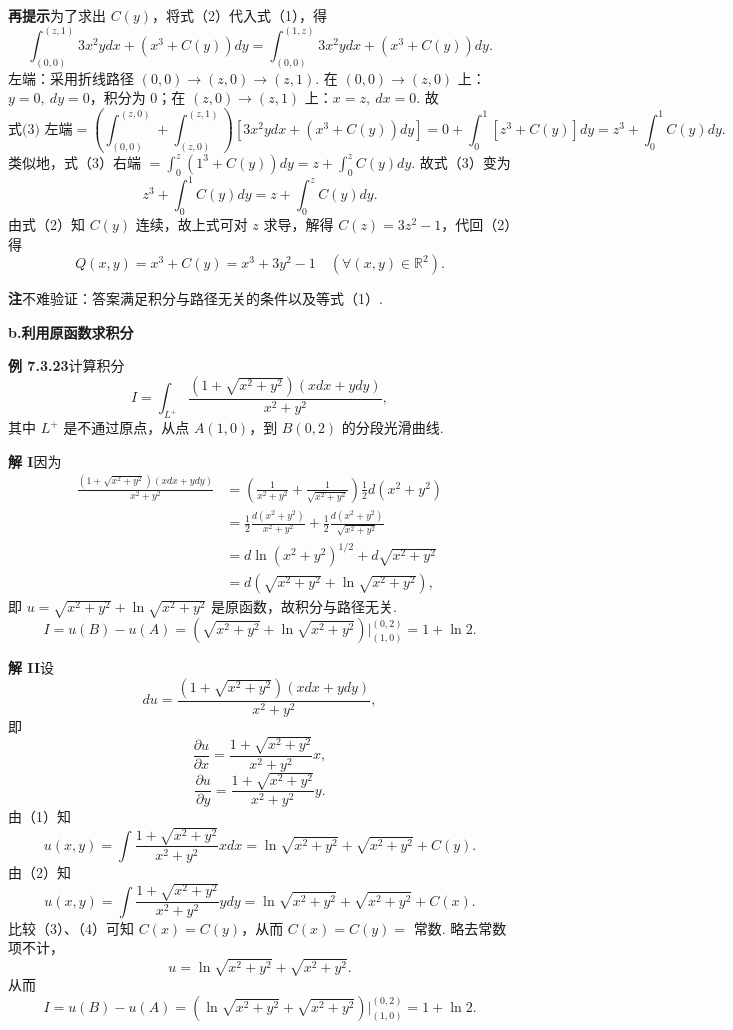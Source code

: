 \documentclass[UTF8,12pt,a4paper,fontset=fandol]{ctexart}
\begin{document}
\noindent\textbf{再提示}\quad 为了求出 $C(y)$，将式（2）代入式（1），得
\[
\int_{(0,0)}^{(z,1)}3x^2ydx+(x^3+C(y))dy
=\int_{(0,0)}^{(1,z)}3x^2ydx+(x^3+C(y))dy. \tag{3}
\]
左端：采用折线路径 $(0,0)\to(z,0)\to(z,1)$. 在 $(0,0)\to(z,0)$ 上：$y=0,\ dy=0$，积分为 0；在 $(z,0)\to(z,1)$ 上：$x=z,\ dx=0$. 故
\[
\text{式(3) 左端}
=\left(\int_{(0,0)}^{(z,0)}+\int_{(z,0)}^{(z,1)}\right)[3x^2ydx+(x^3+C(y))dy]
=0+\int_0^1[z^3+C(y)]dy=z^3+\int_0^1C(y)dy.
\]
类似地，式（3）右端 $=\displaystyle\int_0^z(1^3+C(y))dy=z+\int_0^zC(y)dy$.
故式（3）变为
\[
z^3+\int_0^1C(y)dy=z+\int_0^zC(y)dy.
\]
由式（2）知 $C(y)$ 连续，故上式可对 $z$ 求导，解得 $C(z)=3z^2-1$，代回（2）得
\[
Q(x,y)=x^3+C(y)=x^3+3y^2-1\quad(\forall(x,y)\in\mathbb R^2).
\]

\noindent\textbf{注}\quad 不难验证：答案满足积分与路径无关的条件以及等式（1）.

\noindent\textbf{b.\quad 利用原函数求积分}

\noindent\textbf{例 7.3.23}\quad 计算积分
\[
I=\int_{L^+}\frac{(1+\sqrt{x^2+y^2})(xdx+ydy)}{x^2+y^2},
\]
其中 $L^+$ 是不通过原点，从点 $A(1,0)$，到 $B(0,2)$ 的分段光滑曲线.

\noindent\textbf{解 I}\quad 因为
\[
\begin{aligned}
\frac{(1+\sqrt{x^2+y^2})(xdx+ydy)}{x^2+y^2}
&=\left(\frac1{x^2+y^2}+\frac1{\sqrt{x^2+y^2}}\right)\frac12d(x^2+y^2)\\
&=\frac12\frac{d(x^2+y^2)}{x^2+y^2}
+\frac12\frac{d(x^2+y^2)}{\sqrt{x^2+y^2}}\\
&=d\ln(x^2+y^2)^{1/2}+d\sqrt{x^2+y^2}\\
&=d\left(\sqrt{x^2+y^2}+\ln\sqrt{x^2+y^2}\right),
\end{aligned}
\]
即 $u=\sqrt{x^2+y^2}+\ln\sqrt{x^2+y^2}$ 是原函数，故积分与路径无关.
\[
I=u(B)-u(A)=
\left(\sqrt{x^2+y^2}+\ln\sqrt{x^2+y^2}\right)\Big|_{(1,0)}^{(0,2)}
=1+\ln2.
\]

\noindent\textbf{解 II}\quad 设
\[
du=\frac{(1+\sqrt{x^2+y^2})(xdx+ydy)}{x^2+y^2},
\]
即
\[
\frac{\partial u}{\partial x}
=\frac{1+\sqrt{x^2+y^2}}{x^2+y^2}x, \tag{1}
\]
\[
\frac{\partial u}{\partial y}
=\frac{1+\sqrt{x^2+y^2}}{x^2+y^2}y. \tag{2}
\]
由（1）知
\[
u(x,y)=\int\frac{1+\sqrt{x^2+y^2}}{x^2+y^2}xdx
=\ln\sqrt{x^2+y^2}+\sqrt{x^2+y^2}+C(y). \tag{3}
\]
由（2）知
\[
u(x,y)=\int\frac{1+\sqrt{x^2+y^2}}{x^2+y^2}ydy
=\ln\sqrt{x^2+y^2}+\sqrt{x^2+y^2}+C(x). \tag{4}
\]
比较（3）、（4）可知 $C(x)=C(y)$，从而 $C(x)=C(y)=$ 常数. 略去常数项不计，
\[
u=\ln\sqrt{x^2+y^2}+\sqrt{x^2+y^2}.
\]
从而
\[
I=u(B)-u(A)=
\left(\ln\sqrt{x^2+y^2}+\sqrt{x^2+y^2}\right)\Big|_{(1,0)}^{(0,2)}
=1+\ln2.
\]
\end{document}
